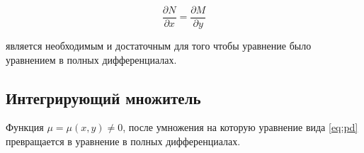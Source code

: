 \[
\frac{\partial N}{\partial x}=\frac{\partial M}{\partial y}
\]

является необходимым и достаточным для того чтобы уравнение было уравнением в полных дифференциалах.

\subsection{Интегрирующий множитель}

Функция $\mu=\mu(x, y)\not = 0$, после умножения на которую уравнение вида \eqref{eq:pd} превращается в уравнение в полных дифференциалах.


